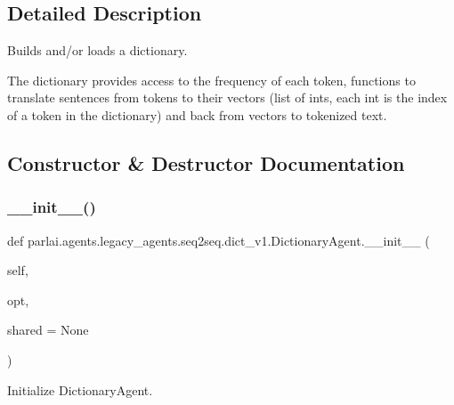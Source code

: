 \subsection{Detailed Description}
\begin{DoxyVerb}Builds and/or loads a dictionary.

The dictionary provides access to the frequency of each token, functions to
translate sentences from tokens to their vectors (list of ints, each int is the
index of a token in the dictionary) and back from vectors to tokenized text.
\end{DoxyVerb}
 

\subsection{Constructor \& Destructor Documentation}
\mbox{\label{classparlai_1_1agents_1_1legacy__agents_1_1seq2seq_1_1dict__v1_1_1DictionaryAgent_ae3eb915e40f2b8dc1788d2fa9d59697c}} 
\subsubsection{\texorpdfstring{\+\_\+\+\_\+init\+\_\+\+\_\+()}{\_\_init\_\_()}}
{\footnotesize\ttfamily def parlai.\+agents.\+legacy\+\_\+agents.\+seq2seq.\+dict\+\_\+v1.\+Dictionary\+Agent.\+\_\+\+\_\+init\+\_\+\+\_\+ (\begin{DoxyParamCaption}\item[{}]{self,  }\item[{}]{opt,  }\item[{}]{shared = {\ttfamily None} }\end{DoxyParamCaption})}

\begin{DoxyVerb}Initialize DictionaryAgent.
\end{DoxyVerb}
 

